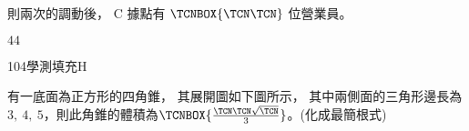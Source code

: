 \begin{QUESTIONS}
\begin{QUESTION}
\begin{QBODY}
			則兩次的調動後， C 據點有 $\TCNBOX{\TCN\TCN}$ 位營業員。
        \end{QBODY}
        \begin{QFROMS}
        \end{QFROMS}
        \begin{QTAGS}\end{QTAGS}
        \begin{QANS}
            $44$
        \end{QANS}
        \begin{QSOLLIST}
        \end{QSOLLIST}
        \begin{QEMPTYSPACE}
        \end{QEMPTYSPACE}
    \end{QUESTION}
    \begin{QUESTION}
        \begin{ExamInfo}{104}{學測}{填充}{H}
        \end{ExamInfo}
        \begin{ExamAnsRateInfo}{43}{77}{41}{11}
        \end{ExamAnsRateInfo}
        \begin{QBODY}
            有一底面為正方形的四角錐， 其展開圖如下圖所示， 其中兩側面的三角形邊長為 $3,\ 4,\ 5$，則此角錐的體積為$\TCNBOX{\frac{\TCN\TCN\sqrt{\TCN}}{3}}$。(化成最簡根式) 
		

\end{QBODY}
\end{QUESTION}
\end{QUESTIONS}

